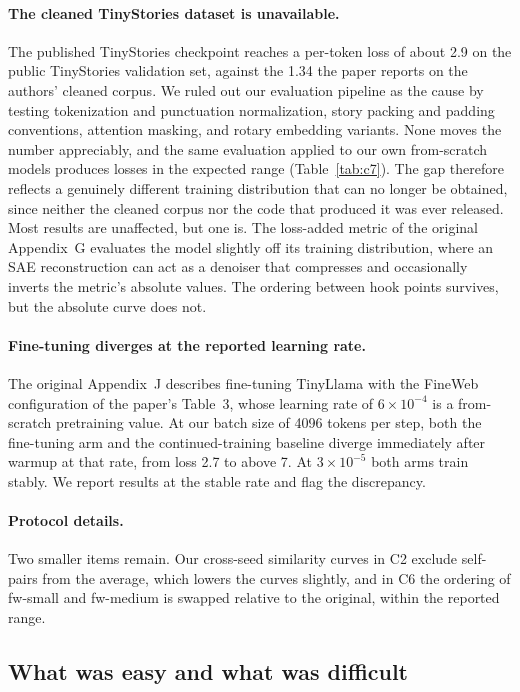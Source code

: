 \documentclass[10pt]{article} %
\begin{document}
\paragraph{The cleaned TinyStories dataset is unavailable.} The published
TinyStories checkpoint reaches a per-token loss of about 2.9 on the public
TinyStories validation set, against the 1.34 the paper reports on the authors'
cleaned corpus. We ruled out our evaluation pipeline as the cause by testing
tokenization and punctuation normalization, story packing and padding conventions,
attention masking, and rotary embedding variants. None moves the number
appreciably, and the same evaluation applied to our own from-scratch models
produces losses in the expected range (Table~\ref{tab:c7}). The gap therefore
reflects a genuinely different training distribution that can no longer be
obtained, since neither the cleaned corpus nor the code that produced it was ever
released. Most results are unaffected, but one is. The loss-added metric of the
original Appendix~G evaluates the model slightly off its training distribution,
where an SAE reconstruction can act as a denoiser that compresses and occasionally
inverts the metric's absolute values. The ordering between hook points survives,
but the absolute curve does not.

\paragraph{Fine-tuning diverges at the reported learning rate.} The original
Appendix~J describes fine-tuning TinyLlama with the FineWeb configuration of the
paper's Table~3, whose learning rate of $6 \times 10^{-4}$ is a from-scratch
pretraining value. At our batch size of 4096 tokens per step, both the fine-tuning
arm and the continued-training baseline diverge immediately after warmup at that
rate, from loss 2.7 to above 7. At $3 \times 10^{-5}$ both arms train stably. We
report results at the stable rate and flag the discrepancy.

\paragraph{Protocol details.} Two smaller items remain. Our cross-seed similarity
curves in C2 exclude self-pairs from the average, which lowers the curves slightly,
and in C6 the ordering of fw-small and fw-medium is swapped relative to the
original, within the reported range.

\subsection{What was easy and what was difficult}
\end{document}
